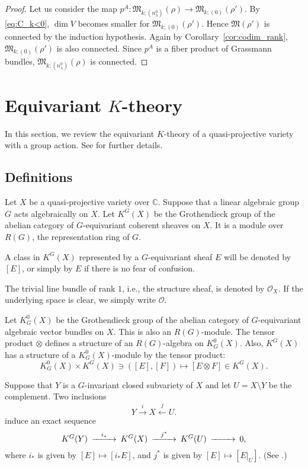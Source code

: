 \documentclass[12pt]{amsart}
\def\Bbb{\mathbb}
\def\frak{\mathfrak}
\theoremstyle{definition}
\theoremstyle{remark}
\numberwithin{equation}{subsection}
\newcommand{\corref}[1]{Corollary~\ref{#1}}
\newcommand{\C}{{\Bbb C}}
\newcommand{\M}{{\frak M}} %
\newcommand{\shfO}{\mathcal O}
\begin{document}
\begin{proof}
Let us consider the map $p^A\colon \M_{k;(n_\lambda^0)}(\rho)\to 
\M_{k;(0)}(\rho')$.
By \eqref{eq:C_k<0}, $\dim V$ becomes smaller for
$\M_{k;(0)}(\rho')$. Hence $\M(\rho')$ is connected by the induction
hypothesis. Again by \corref{cor:codim_rank}, $\M_{k;(0)}(\rho')$ is also
connected. Since $p^A$ is a fiber product of Grassmann bundles,
$\M_{k;(n_\lambda^0)}(\rho)$ is connected.
\end{proof}

\section{Equivariant $K$-theory}

In this section, we review the equivariant $K$-theory of 
a quasi-projective variety with a group action.
See \cite[Chapter~5]{Gi-book} for further details.

\subsection{Definitions}

Let $X$ be a quasi-projective variety over $\C$.  Suppose that a
linear algebraic group $G$ acts algebraically on $X$. 
%
Let $K^G(X)$ be the Grothendieck group of the abelian category of
$G$-equivariant coherent sheaves on $X$.
%
It is a module over $R(G)$, the representation ring of $G$.

A class in $K^G(X)$ represented by a $G$-equivariant sheaf $E$ will be
denoted by $[E]$, or simply by $E$ if there is no fear of confusion.

The trivial line bundle of rank $1$, i.e., the structure sheaf, is
denoted by $\shfO_X$. If the underlying space is clear, we simply
write $\shfO$.

Let $K_G^0(X)$ be the Grothendieck group of the abelian category of
$G$-equivariant algebraic vector bundles on $X$. 
This is also an $R(G)$-module. The tensor product
$\otimes$ defines a structure of an $R(G)$-algebra on $K_G^0(X)$. Also,
$K^G(X)$ has a structure of a $K_G^0(X)$-module by the tensor
product:
\begin{equation}\label{eq:tensor}
   K_G^0(X)\times K^G(X)\ni ([E],[F]) \mapsto
   [E\otimes F] \in K^G(X).
\end{equation}

Suppose that $Y$ is a $G$-invariant closed subvariety of $X$ and let
$U = X\setminus Y$ be the complement. Two inclusions
\begin{equation*}
   Y \xrightarrow{i} X \xleftarrow{j} U.
\end{equation*}
induce an exact sequence
\begin{equation}\label{eq:exact}
\begin{CD}
   K^G(Y)  @>{i_*}>> K^G(X) @>{j^*}>> K^G(U) @>>> 0,
\end{CD}
\end{equation}
where $i_*$ is given by $[E]\mapsto [i_* E]$, and $j^*$ is given by
$[E]\mapsto [E|_U]$. (See \cite{Thom}.)
\end{document}
